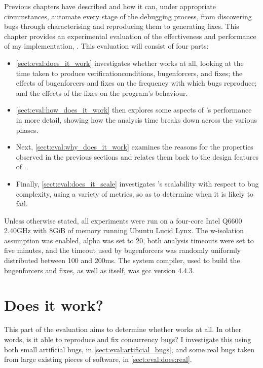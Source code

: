 \noindent
Previous chapters have described {\technique} and how it can, under
appropriate circumstances, automate every stage of the debugging
process, from discovering bugs through characterising and reproducing
them to generating fixes.  This chapter provides an experimental
evaluation of the effectiveness and performance of my implementation,
{\implementation}.  This evaluation will consist of four parts:
\begin{itemize}
\item \autoref{sect:eval:does_it_work} investigates whether
  {\implementation} works at all, looking at the time taken to produce
  \glspl{verificationcondition}, \glspl{bugenforcer}, and fixes; the
  effects of \glspl{bugenforcer} and fixes on the frequency with which
  bugs reproduce; and the effects of the fixes on the program's
  behaviour.
\item \autoref{sect:eval:how_does_it_work} then explores some aspects
  of {\implementation}'s performance in more detail, showing how the
  analysis time breaks down across the various phases.
\item Next, \autoref{sect:eval:why_does_it_work} examines the reasons
  for the properties observed in the previous sections and relates
  them back to the design features of {\technique}.
\item Finally, \autoref{sect:eval:does_it_scale} investigates
  {\implementation}'s scalability with respect to bug complexity, using a
  variety of metrics, so as to determine when it is likely to fail.
\end{itemize}
Unless otherwise stated, all experiments were run on a four-core Intel
Q6600 2.40GHz with 8GiB of memory running Ubuntu Lucid Lynx.  The
\gls{w-isolation} assumption was enabled, \gls{alpha} was set to 20,
both analysis timeouts were set to five minutes, and the timeout used
by \glspl{bugenforcer} was randomly uniformly distributed between 100
and 200ms.  The system compiler, used to build the \glspl{bugenforcer}
and fixes, as well as {\implementation} itself, was gcc version 4.4.3.

\section{Does it work?}
\label{sect:eval:does_it_work}

This part of the evaluation aims to determine whether {\implementation}
works at all.  In other words, is it able to reproduce and fix
concurrency bugs?  I investigate this using both small artificial
bugs, in \autoref{sect:eval:artificial_bugs}, and some real bugs taken
from large existing pieces of software, in
\autoref{sect:eval:does:real}.

